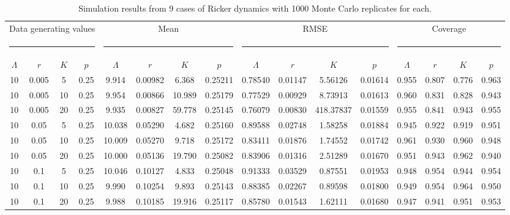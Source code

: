 \documentclass{article}
\begin{document}
\begin{landscape}
\begin{table}
  \centering
  \footnotesize
  \caption{Simulation results from 9 cases of Ricker dynamics with 1000 Monte Carlo replicates for each.}
  \begin{tabular}{cccccccccccccccc}
    \hline
    \multicolumn{4}{c}{Data generating values}&
    \multicolumn{4}{c}{Mean} &
    \multicolumn{4}{c}{RMSE} &
    \multicolumn{4}{c}{Coverage} \\
    \multicolumn{4}{c}{\rule{4cm}{1pt}} &
    \multicolumn{4}{c}{\rule{4cm}{1pt}} &
    \multicolumn{4}{c}{\rule{4cm}{1pt}} &
    \multicolumn{4}{c}{\rule{4cm}{1pt}} \\
    $\Lambda$ & $r$ & $K$ & $p$ & $\Lambda$ & $r$ & $K$ & $p$ & $\Lambda$ & $r$ & $K$ &
    $p$ & $\Lambda$ & $r$ & $K$ & $p$ \\
    \hline
10	&0.005	&5	&0.25	&9.914 &0.00982  &6.368 &0.25211	&0.78540 &0.01147   &5.56126 &0.01614	&0.955 &0.807 &0.776 &0.963\\
10	&0.005	&10	&0.25	&9.954 &0.00866 &10.989 &0.25179 &0.77529 &0.00929   &8.73913 &0.01613  &0.960 &0.831 &0.828 &0.943\\
10	&0.005	&20	&0.25	&9.935 &0.00827 &59.778 &0.25145 &0.76079 &0.00830 &418.37837 &0.01559  &0.955 &0.841 &0.943 &0.955\\
10	&0.05	&5	&0.25	&10.038 &0.05290  &4.682 &0.25160 &0.89588 &0.02748   &1.58258 &0.01884  &0.945 &0.922 &0.919 &0.951\\
10	&0.05	&10	&0.25	&10.009 &0.05270  &9.718 &0.25172 &0.83411 &0.01876   &1.74552 &0.01742  &0.961 &0.930 &0.960 &0.948\\
10	&0.05	&20	&0.25	&10.000 &0.05136 &19.790 &0.25082 &0.83906 &0.01316   &2.51289 &0.01670  &0.951 &0.943 &0.962 &0.940\\
10	&0.1	&5	&0.25	&10.046 &0.10127  &4.833 &0.25048 &0.91333 &0.03529   &0.87551 &0.01953  &0.948 &0.954 &0.944 &0.954\\
10	&0.1	&10	&0.25	&9.990 &0.10254  &9.893 &0.25143 &0.88385 &0.02267   &0.89598 &0.01800  &0.949 &0.954 &0.964 &0.950\\
10	&0.1	&20	&0.25	&9.988 &0.10185 &19.916 &0.25117 &0.85780 &0.01543   &1.62111 &0.01680  &0.947 &0.941 &0.951 &0.953\\
  \hline
  \end{tabular}
  \label{tab:simricker}
\end{table}


\end{landscape}
\end{document}
